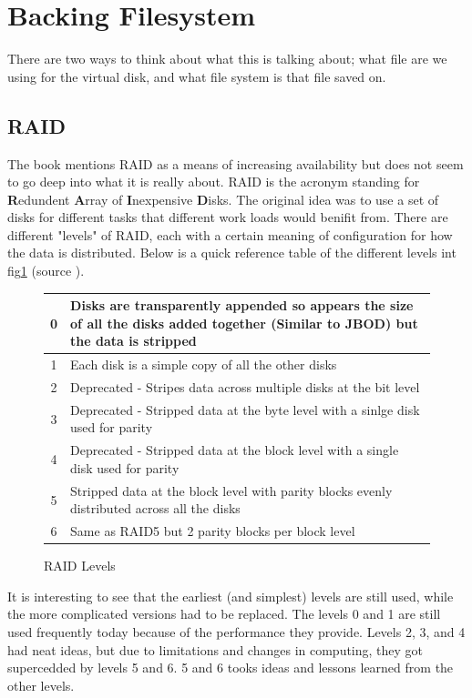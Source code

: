 \documentclass[12pt]{article}
\begin{document}
\section{Backing Filesystem}

There are two ways to think about what this is talking about; what file are we using for the virtual disk, and what file system is that file saved on.

\subsection{RAID}

The book mentions RAID as a means of increasing availability but does not seem to go deep into what it is really about.
RAID is the acronym standing for \textbf{R}edundent \textbf{A}rray of \textbf{I}nexpensive \textbf{D}isks.
The original idea was to use a set of disks for different tasks that different work loads would benifit from.
There are different "levels" of RAID, each with a certain meaning of configuration for how the data is distributed.
Below is a quick reference table of the different levels int fig\ref{fig:raid_levels} (source \cite{wiki_raidLevels}).

\begin{figure}[ht]
	\centering
	\begin{tabular}{|c|p{}|}
	\hline
	0 & Disks are transparently appended so appears the size of all the disks added together (Similar to JBOD) but the data is stripped \\ \hline
	1 & Each disk is a simple copy of all the other disks \\ \hline
	2 & Deprecated - Stripes data across multiple disks at the bit level \\ \hline
	3 & Deprecated - Stripped data at the byte level with a sinlge disk used for parity \\ \hline
	4 & Deprecated - Stripped data at the block level with a single disk used for parity \\ \hline
	5 & Stripped data at the block level with parity blocks evenly distributed across all the disks \\ \hline
	6 & Same as RAID5 but 2 parity blocks per block level \\ \hline
	\end{tabular}
	\caption{RAID Levels}
	\label{fig:raid_levels}
\end{figure}

It is interesting to see that the earliest (and simplest) levels are still used, while the more complicated versions had to be replaced.
The levels 0 and 1 are still used frequently today because of the performance they provide.
Levels 2, 3, and 4 had neat ideas, but due to limitations and changes in computing, they got supercedded by levels 5 and 6.
5 and 6 tooks ideas and lessons learned from the other levels.
\end{document}
